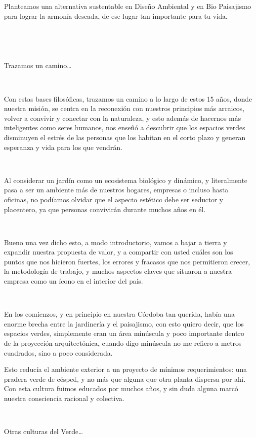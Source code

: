 Planteamos una alternativa sustentable en Diseño Ambiental y en Bio
Paisajismo para lograr la armonía deseada, de ese lugar tan importante
para tu vida.

~

~

Trazamos un camino\ldots{}

~

Con estas bases filosóficas, trazamos un camino a lo largo de estos 15
años, donde nuestra misión, se centra en la reconexión con nuestros
principios más arcaicos, volver a convivir y conectar con la naturaleza,
y esto además de hacernos más inteligentes como seres humanos, nos
enseñó a descubrir que los espacios verdes disminuyen el estrés de las
personas que los habitan en el corto plazo y generan esperanza y vida
para los que vendrán.

~

Al considerar un jardín como un ecosistema biológico y dinámico, y
literalmente pasa a ser un ambiente más de nuestros hogares, empresas o
incluso hasta oficinas, no podíamos olvidar que el aspecto estético debe
ser seductor y placentero, ya que personas convivirán durante muchos
años en él.

~

Bueno una vez dicho esto, a modo introductorio, vamos a bajar a tierra y
expandir nuestra propuesta de valor, y a compartir con usted cuáles son
los puntos que nos hicieron fuertes, los errores y fracasos que nos
permitieron crecer, la metodología de trabajo, y muchos aspectos claves
que situaron a nuestra empresa como un ícono en el interior del país.

~

En los comienzos, y en principio en nuestra Córdoba tan querida, había
una enorme brecha entre la jardinería y el paisajismo, con esto quiero
decir, que los espacios verdes, simplemente eran un área minúscula y
poco importante dentro de la proyección arquitectónica, cuando digo
minúscula no me refiero a metros cuadrados, sino a poco considerada.

Esto reducía el ambiente exterior a un proyecto de mínimos
requerimientos: una pradera verde de césped, y no más que alguna que
otra planta dispersa por ahí. Con esta cultura fuimos educados por
muchos años, y sin duda alguna marcó nuestra consciencia racional y
colectiva.

~

Otras culturas del Verde\ldots{}

~

